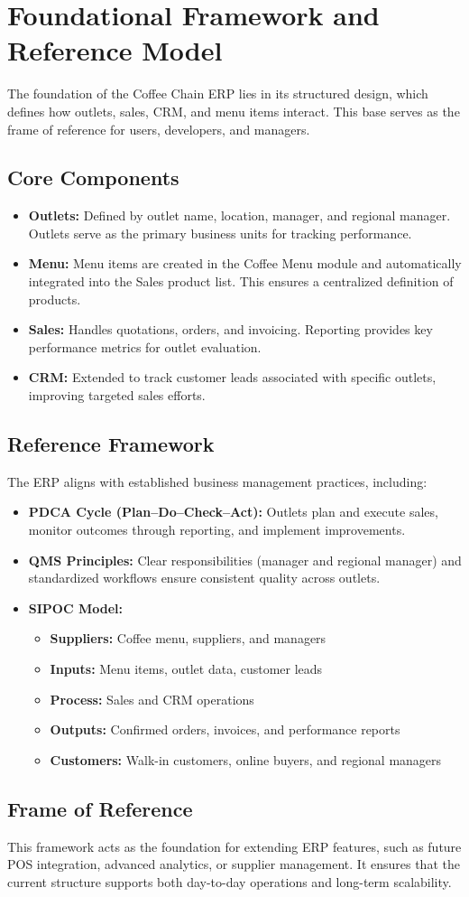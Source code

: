 \chapter{Foundational Framework and Reference Model}

The foundation of the Coffee Chain ERP lies in its structured 
design, which defines how outlets, sales, CRM, and menu items 
interact. This base serves as the frame of reference for users, 
developers, and managers.

\section*{Core Components}
\begin{itemize}
    \item \textbf{Outlets:} Defined by outlet name, location, manager, 
    and regional manager. Outlets serve as the primary business units 
    for tracking performance.
    \item \textbf{Menu:} Menu items are created in the Coffee Menu 
    module and automatically integrated into the Sales product list. 
    This ensures a centralized definition of products.
    \item \textbf{Sales:} Handles quotations, orders, and invoicing. 
    Reporting provides key performance metrics for outlet evaluation.
    \item \textbf{CRM:} Extended to track customer leads associated 
    with specific outlets, improving targeted sales efforts.
\end{itemize}

\section*{Reference Framework}
The ERP aligns with established business management practices, 
including:
\begin{itemize}
    \item \textbf{PDCA Cycle (Plan–Do–Check–Act):} Outlets plan and 
    execute sales, monitor outcomes through reporting, and implement 
    improvements.
    \item \textbf{QMS Principles:} Clear responsibilities (manager and 
    regional manager) and standardized workflows ensure consistent 
    quality across outlets.
    \item \textbf{SIPOC Model:}
    \begin{itemize}
        \item \textbf{Suppliers:} Coffee menu, suppliers, and managers
        \item \textbf{Inputs:} Menu items, outlet data, customer leads
        \item \textbf{Process:} Sales and CRM operations
        \item \textbf{Outputs:} Confirmed orders, invoices, and 
        performance reports
        \item \textbf{Customers:} Walk-in customers, online buyers, 
        and regional managers
    \end{itemize}
\end{itemize}

\section*{Frame of Reference}
This framework acts as the foundation for extending ERP features, 
such as future POS integration, advanced analytics, or supplier 
management. It ensures that the current structure supports both 
day-to-day operations and long-term scalability.
